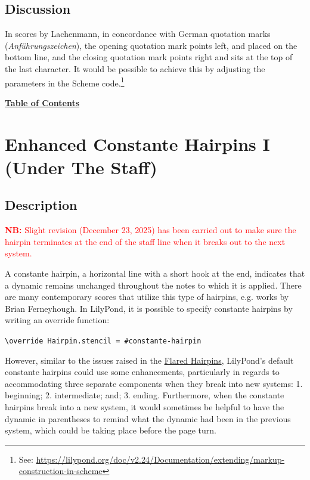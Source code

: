 \subsection{Discussion}

In scores by Lachenmann, in concordance with German quotation marks (\textit{Anführungszeichen}), the opening quotation mark points left, and placed on the bottom line, and the closing quotation mark points right and sits at the top of the last character. It would be possible to achieve this by adjusting the parameters in the Scheme code.\footnote{See: \url{https://lilypond.org/doc/v2.24/Documentation/extending/markup-construction-in-scheme}}

\hyperref[sec:toc]{\textbf{Table of Contents}}
\vfill \break





\section {Enhanced Constante Hairpins I (Under The Staff)}
\label{sec:enhanced_constante_hairpins_1}
\hfill
{}
\hfill

\subsection{Description}

\textcolor{red}{\textbf{NB: } Slight revision (December 23, 2025) has been carried out to make sure the hairpin terminates at the end of the staff line when it breaks out to the next system. }

A constante hairpin, a horizontal line with a short hook at the end, indicates that a dynamic remains unchanged throughout the notes to which it is applied. There are many contemporary scores that utilize this type of hairpins, e.g. works by Brian Ferneyhough. In LilyPond, it is possible to specify constante hairpins by writing an override function: 

\verb|\override Hairpin.stencil = #constante-hairpin|

However, similar to the issues raised in the \hyperref[sec:enhanced_flared_hairpins_1]{Flared Hairpins}, LilyPond's default constante hairpins could use some enhancements, particularly in regards to accommodating three separate components when they break into new systems: 1. beginning; 2. intermediate; and; 3. ending. Furthermore, when the constante hairpins break into a new system, it would sometimes be helpful to have the dynamic in parentheses to remind what the dynamic had been in the previous system, which could be taking place before the page turn. 

